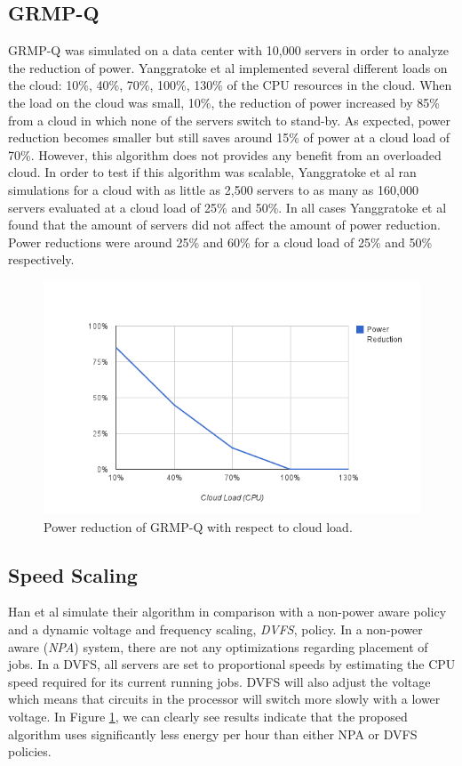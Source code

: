 \documentclass{sig-alternate}
\begin{document}
\subsection{GRMP-Q}
\label{sec:GRMP-Q}

GRMP-Q was simulated on a data center with 10,000 servers in order to analyze the reduction of power. Yanggratoke et al implemented several different loads on the cloud: 10\%, 40\%, 70\%, 100\%, 130\% of the CPU resources in the cloud. When the load on the cloud was small, 10\%, the reduction of power increased by 85\% from a cloud in which none of the servers switch to stand-by. As expected, power reduction becomes smaller but still saves around 15\% of power at a cloud load of 70\%.  However, this algorithm does not provides any benefit from an overloaded cloud.  In order to test if this algorithm was scalable, Yanggratoke et al ran simulations for a cloud with as little as 2,500 servers to as many as 160,000 servers evaluated at a cloud load of 25\% and 50\%. In all cases Yanggratoke et al found that the amount of servers did not affect the amount of power reduction. Power reductions were around 25\% and 60\% for a cloud load of 25\% and 50\% respectively.  


\begin{figure}[tb]
 \includegraphics[height=0.35 \textwidth]{image}
 \caption{Power reduction of GRMP-Q with respect to cloud load. }
 \label{fig:Results_SS}
\end{figure}

\subsection{Speed Scaling}
\label{sec:SS}

Han et al simulate their algorithm in comparison with a non-power aware policy and a dynamic voltage and frequency scaling, \emph{DVFS}, policy. In a non-power aware (\emph{NPA}) system, there are not any optimizations regarding placement of jobs. In a DVFS, all servers are set to proportional speeds by estimating the CPU speed required for its current running jobs. DVFS will also adjust the voltage which means that circuits in the processor will switch more slowly with a lower voltage. In Figure \ref{fig:Results_SS},  we can clearly see results indicate that the proposed algorithm uses significantly less energy per hour than either NPA or DVFS policies.
\end{document}
